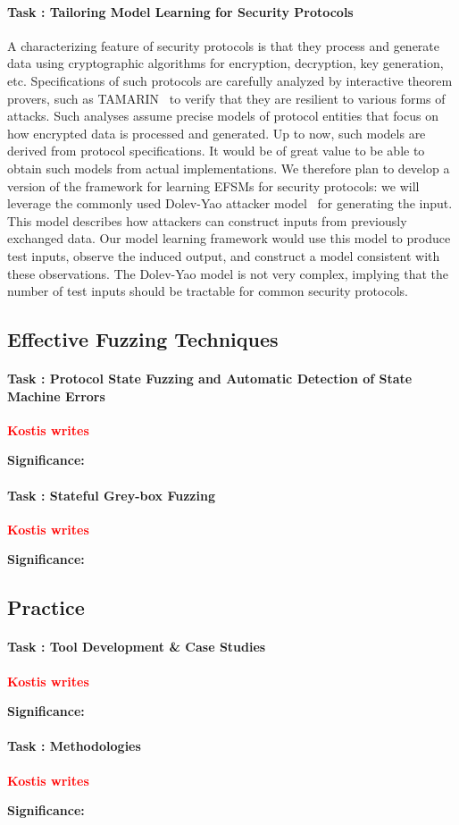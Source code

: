 \documentclass[11pt]{article}
\newcommand{\FIX}[1]{\textcolor{red}{\textbf{#1}}}
\newcounter{Task}
\newcommand{\task}[1]{\addtocounter{Task}{1}\paragraph{Task \theTask: #1}}
\newcommand{\significance}[1]{\vspace*{-0.5em}%
  \begin{quoting}\noindent\textbf{Significance:} #1\end{quoting}}
\newcommand{\myparagraph}{}
\let\myparagraph=\paragraph
\renewcommand{\paragraph}{\vspace{-3mm}\myparagraph}
\begin{document}
\task{Tailoring Model Learning for Security Protocols}
A characterizing feature of security protocols is that they process and generate data using cryptographic algorithms for encryption, decryption, key generation, etc. Specifications of such protocols are carefully analyzed by interactive theorem provers, such as TAMARIN~\cite{TAMARIN@CAV-13} to verify that they are resilient to various forms of attacks. Such analyses assume precise models of protocol entities that focus on how encrypted data is processed and generated. Up to now, such models are derived from protocol specifications. It would be of great value to be able to obtain such models from actual implementations. We therefore plan to develop a version of the framework for learning EFSMs for security protocols: we
will leverage the commonly used Dolev-Yao attacker model~\cite{DolevYao83} for generating the input. This model describes how attackers can construct inputs from previously exchanged data. Our
model learning framework would use this model to produce test inputs, observe the induced output, and construct a model consistent with these observations. The Dolev-Yao model is not very complex, implying that the number of test inputs should be tractable for common security protocols.


\subsection{Effective Fuzzing Techniques}

\task{Protocol State Fuzzing and Automatic Detection of State Machine Errors}
\FIX{Kostis writes}
\significance{}

\task{Stateful Grey-box Fuzzing} \FIX{Kostis writes}
\significance{}

\subsection{Practice}

\task{Tool Development \& Case Studies} \FIX{Kostis writes}
\significance{}

\task{Methodologies} \FIX{Kostis writes}
\significance{}
\end{document}

